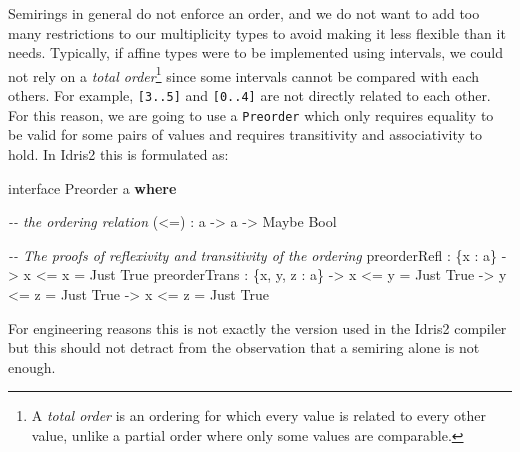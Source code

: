 \documentclass[
]{article}
\newenvironment{Shaded}{}{}
\newcommand{\CommentTok}[1]{\textcolor[rgb]{0.38,0.63,0.69}{\textit{#1}}}
\newcommand{\DataTypeTok}[1]{\textcolor[rgb]{0.56,0.13,0.00}{#1}}
\newcommand{\KeywordTok}[1]{\textcolor[rgb]{0.00,0.44,0.13}{\textbf{#1}}}
\newcommand{\NormalTok}[1]{#1}
\newcommand{\OperatorTok}[1]{\textcolor[rgb]{0.40,0.40,0.40}{#1}}
\newcommand{\OtherTok}[1]{\textcolor[rgb]{0.00,0.44,0.13}{#1}}
\begin{document}
Semirings in general do not enforce an order, and we do not want to add
too many restrictions to our multiplicity types to avoid making it less
flexible than it needs. Typically, if affine types were to be
implemented using intervals, we could not rely on a \emph{total
order}\footnote{A \emph{total order} is an ordering for which every
  value is related to every other value, unlike a partial order where
  only some values are comparable.} since some intervals cannot be
compared with each others. For example, \texttt{{[}3..5{]}} and
\texttt{{[}0..4{]}} are not directly related to each other. For this
reason, we are going to use a \texttt{Preorder} which only requires
equality to be valid for some pairs of values and requires transitivity
and associativity to hold. In Idris2 this is formulated as:

\begin{Shaded}
\begin{Highlighting}[]
\NormalTok{interface }\DataTypeTok{Preorder}\NormalTok{ a }\KeywordTok{where}

  \CommentTok{{-}{-} the ordering relation}
\NormalTok{  (}\OperatorTok{\textless{}=}\NormalTok{) }\OperatorTok{:}\NormalTok{ a }\OtherTok{{-}\textgreater{}}\NormalTok{ a }\OtherTok{{-}\textgreater{}} \DataTypeTok{Maybe} \DataTypeTok{Bool}

  \CommentTok{{-}{-} The proofs of reflexivity and transitivity of the ordering}
\NormalTok{  preorderRefl }\OperatorTok{:}\NormalTok{ \{x }\OperatorTok{:}\NormalTok{ a\} }\OtherTok{{-}\textgreater{}}\NormalTok{ x }\OperatorTok{\textless{}=}\NormalTok{ x }\OtherTok{=} \DataTypeTok{Just} \DataTypeTok{True}
\NormalTok{  preorderTrans }\OperatorTok{:}\NormalTok{ \{x, y, z }\OperatorTok{:}\NormalTok{ a\} }\OtherTok{{-}\textgreater{}}\NormalTok{ x }\OperatorTok{\textless{}=}\NormalTok{ y }\OtherTok{=} \DataTypeTok{Just} \DataTypeTok{True} 
                                \OtherTok{{-}\textgreater{}}\NormalTok{ y }\OperatorTok{\textless{}=}\NormalTok{ z }\OtherTok{=} \DataTypeTok{Just} \DataTypeTok{True} 
                                \OtherTok{{-}\textgreater{}}\NormalTok{ x }\OperatorTok{\textless{}=}\NormalTok{ z }\OtherTok{=} \DataTypeTok{Just} \DataTypeTok{True}
\end{Highlighting}
\end{Shaded}

For engineering reasons this is not exactly the version used in the
Idris2 compiler but this should not detract from the observation that a
semiring alone is not enough.
\end{document}
